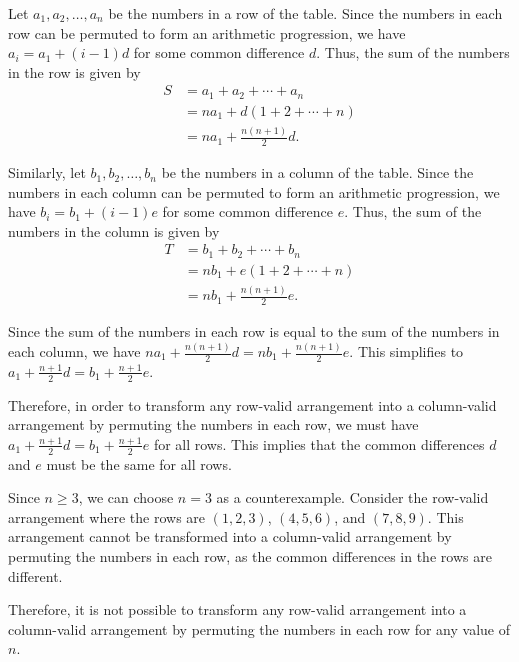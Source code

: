 Let $a_1, a_2, \ldots, a_n$ be the numbers in a row of the table. Since the numbers in each row can be permuted to form an arithmetic progression, we have $a_i = a_1 + (i-1)d$ for some common difference $d$. Thus, the sum of the numbers in the row is given by
\begin{align*}
S &= a_1 + a_2 + \cdots + a_n \\
&= na_1 + d\left(1 + 2 + \cdots + n\right) \\
&= na_1 + \frac{n(n+1)}{2}d.
\end{align*}

Similarly, let $b_1, b_2, \ldots, b_n$ be the numbers in a column of the table. Since the numbers in each column can be permuted to form an arithmetic progression, we have $b_i = b_1 + (i-1)e$ for some common difference $e$. Thus, the sum of the numbers in the column is given by
\begin{align*}
T &= b_1 + b_2 + \cdots + b_n \\
&= nb_1 + e\left(1 + 2 + \cdots + n\right) \\
&= nb_1 + \frac{n(n+1)}{2}e.
\end{align*}

Since the sum of the numbers in each row is equal to the sum of the numbers in each column, we have $na_1 + \frac{n(n+1)}{2}d = nb_1 + \frac{n(n+1)}{2}e$. This simplifies to $a_1 + \frac{n+1}{2}d = b_1 + \frac{n+1}{2}e$.

Therefore, in order to transform any row-valid arrangement into a column-valid arrangement by permuting the numbers in each row, we must have $a_1 + \frac{n+1}{2}d = b_1 + \frac{n+1}{2}e$ for all rows. This implies that the common differences $d$ and $e$ must be the same for all rows.

Since $n \geq 3$, we can choose $n = 3$ as a counterexample. Consider the row-valid arrangement where the rows are $(1, 2, 3)$, $(4, 5, 6)$, and $(7, 8, 9)$. This arrangement cannot be transformed into a column-valid arrangement by permuting the numbers in each row, as the common differences in the rows are different.

Therefore, it is not possible to transform any row-valid arrangement into a column-valid arrangement by permuting the numbers in each row for any value of $n$.
